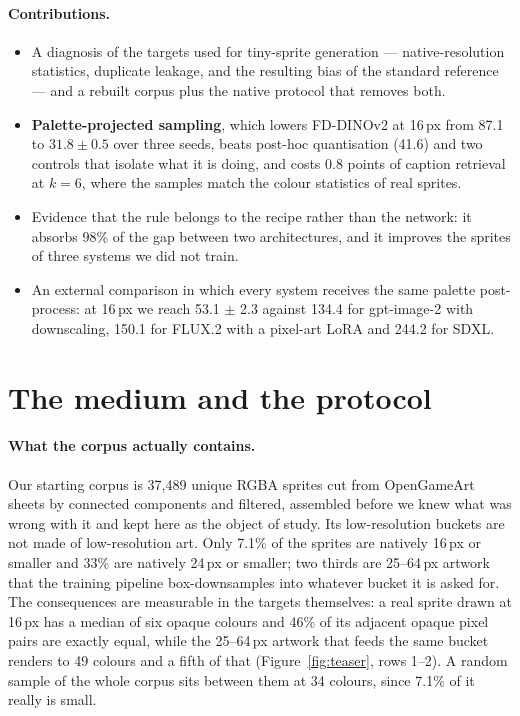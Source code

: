 \documentclass[10pt,twocolumn,letterpaper]{article}
\begin{document}
\paragraph{Contributions.}
\begin{itemize}[leftmargin=1.2em,itemsep=1pt,topsep=2pt]
  \item A diagnosis of the targets used for tiny-sprite generation --- native-resolution statistics, duplicate leakage,
  and the resulting bias of the standard reference --- and a rebuilt corpus plus the native protocol that removes both.
  \item \textbf{Palette-projected sampling}, which lowers FD-DINOv2 at 16\,px from 87.1 to $31.8 \pm 0.5$ over three
  seeds, beats post-hoc quantisation (41.6) and two controls that isolate what it is doing, and costs 0.8 points of
  caption retrieval at $k{=}6$, where the samples match the colour statistics of real sprites.
  \item Evidence that the rule belongs to the recipe rather than the network: it absorbs 98\% of the gap between two
  architectures, and it improves the sprites of three systems we did not train.
  \item An external comparison in which every system receives the same palette post-process: at 16\,px we reach
  53.1 $\pm$ 2.3 against 134.4 for gpt-image-2 with downscaling, 150.1 for FLUX.2 with a pixel-art LoRA and 244.2
  for SDXL.
\end{itemize}

\section{The medium and the protocol}
\label{sec:protocol}

\paragraph{What the corpus actually contains.}
Our starting corpus is 37{,}489 unique RGBA sprites cut from OpenGameArt sheets by connected components and filtered,
assembled before we knew what was wrong with it and kept here as the object of study. Its low-resolution buckets are not made of low-resolution art.
Only 7.1\% of the sprites are natively 16\,px or smaller and 33\% are natively 24\,px or smaller; two thirds are
25--64\,px artwork that the training pipeline box-downsamples into whatever bucket it is asked for. The consequences
are measurable in the targets themselves: a real sprite drawn at 16\,px has a median of six opaque colours and 46\% of
its adjacent opaque pixel pairs are exactly equal, while the 25--64\,px artwork that feeds the same bucket renders to
49 colours and a fifth of that (Figure~\ref{fig:teaser}, rows 1--2). A random sample of the whole corpus sits between
them at 34 colours, since 7.1\% of it really is small.
\end{document}

